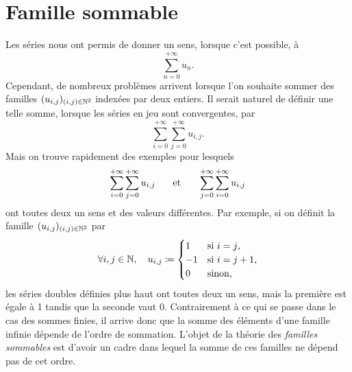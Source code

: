 \documentclass{magnolia}
\begin{document}





\section{Famille sommable}

Les séries nous ont permis de donner un sens, lorsque c'est possible, à
\[\sum_{n=0}^{+\infty} u_n.\]
Cependant, de nombreux problèmes arrivent lorsque l'on souhaite sommer des familles $(u_{i,j})_{(i,j)\in\mathbb{N}^2}$
indexées par deux entiers. Il serait naturel de définir une telle somme, lorsque les séries en jeu
sont convergentes, par
\[\sum_{i=0}^{+\infty} \sum_{j=0}^{+\infty} u_{i,j}.\]
Mais on trouve rapidement des exemples pour lesquels
\[\sum_{i=0}^{+\infty} \sum_{j=0}^{+\infty} u_{i,j} \quad\quad\!\text{et}\quad\!\quad
  \sum_{j=0}^{+\infty} \sum_{i=0}^{+\infty} u_{i,j}\]
ont toutes deux un sens et des valeurs différentes. Par exemple, si on définit la famille $(u_{i,j})_{(i,j)\in\mathbb{N}^2}$
par
\[\forall i,j\in\mathbb{N},\quad u_{i,j}\coloneqq\begin{cases}
  1 & \text{si $i=j$,}\\
  -1 & \text{si $i=j+1$,}\\
  0 & \text{sinon,}\end{cases}\]
les séries doubles définies plus haut ont toutes deux un sens, mais la première est égale à 1 tandis que la seconde
vaut 0. Contrairement à ce qui se passe dans le cas des sommes finies, il arrive donc que la \og somme \fg des éléments
d'une famille infinie dépende de l'ordre de sommation. L'objet de la théorie des \emph{familles sommables} est d'avoir
un cadre dans lequel la somme de ces familles ne dépend pas de cet ordre.
\end{document}
